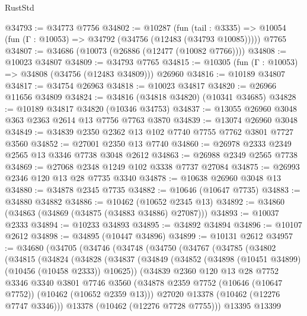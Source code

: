 \begin{lexlean}{RustStd}
\begin{coremodule}
@34793 := @34773 @7756
@34802 := @10287
    (fun (tail : @3335) => @10054 (fun (Γ : @10053) => @34792 (@34756 (@12483 (@34793 @10085)))))
    @7765
@34807 := @34686 (@10073 (@26886 (@12477 (@10082 @7766))))
@34808 := @10023 @34807
@34809 := @34793 @7765
@34815 := @10305 (fun (Γ : @10053) => @34808 (@34756 (@12483 @34809))) @26960
@34816 := @10189 @34807
@34817 := @34754 @26963
@34818 := @10023 @34817
@34820 := @26966 @11656 @34809
@34824 := @34816 (@34818 @34820) (@10341 @34685)
@34828 := @10189 @34817 @34820 (@10346 @34753)
@34837 := @13055 @26960 @3048 @363 @2363 @2614 @13 @7756 @7763 @3870
@34839 := @13074 @26960 @3048
@34849 := @34839 @2350 @2362 @13 @102 @7740 @7755 @7762 @3801 @7727 @3560
@34852 := @27001 @2350 @13 @7740
@34860 := @26978 @2333 @2349 @2565 @13 @3346 @7738 @3048 @2612
@34863 := @26988 @2349 @2565 @7738
@34869 := @27068 @2348 @1249 @102 @3338 @7737 @27084
@34875 := @26993 @2346 @120 @13 @28 @7735 @3340
@34878 := @10638 @26960 @3048 @13
@34880 := @34878 @2345 @7735
@34882 := @10646 (@10647 @7735)
@34883 := @34880 @34882
@34886 := @10462 (@10652 @2345 @13)
@34892 := @34860 (@34863 (@34869 (@34875 (@34883 @34886) @27087)))
@34893 := @10037 @2333
@34894 := @10233 @34893
@34895 := @34892 @34894
@34896 := @10107 @2612
@34898 := @34895 (@10447 @34896)
@34899 := @10131 @2612
@34957 := @34680
    (@34705
      (@34746
        (@34748
          (@34750
            (@34767
              (@34785
                (@34802
                  (@34815
                    (@34824
                      (@34828
                        (@34837
                          (@34849
                            (@34852 (@34898 (@10451 @34899) (@10456 (@10458 @2333)) @10625))
                            (@34839
                              @2360
                              @120
                              @13
                              @28
                              @7752
                              @3346
                              @3340
                              @3801
                              @7746
                              @3560
                              (@34878
                                @2359
                                @7752
                                (@10646 (@10647 @7752))
                                (@10462 (@10652 @2359 @13)))
                              @27020
                              @13378
                              (@10462 (@12276 @7747 @3346)))
                            @13378
                            (@10462 (@12276 @7728 @7755)))
                          @13395
                          @13399

\end{coremodule}
\end{lexlean}
